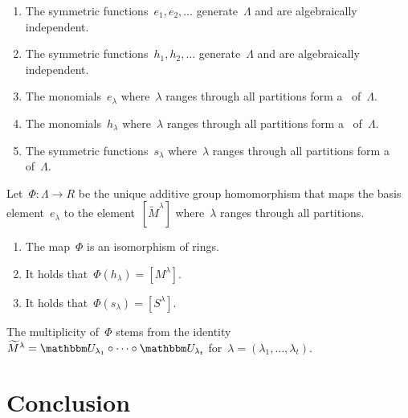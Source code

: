 \documentclass[a4paper,10pt]{scrartcl}
\begin{document}
\begin{proposition}
  \leavevmode
  \begin{enumerate}
    \item
      The symmetric functions~$e_1, e_2, \dotsc$ generate~$\Lambda$ and are algebraically independent.
    \item
      The symmetric functions~$h_1, h_2, \dotsc$ generate~$\Lambda$ and are algebraically independent.
    \item
      The monomials~$e_\lambda$ where~$\lambda$ ranges through all partitions form a~{\basis{$\Integer$}} of~$\Lambda$.
    \item
      The monomials~$h_\lambda$ where~$\lambda$ ranges through all partitions form a~{\basis{$\Integer$}} of~$\Lambda$.
    \item
      The symmetric functions~$s_\lambda$ where~$\lambda$ ranges through all partitions form a~{\basis{$\Integer$}} of~$\Lambda$.
  \end{enumerate}
\end{proposition}


\begin{theorem}
  Let~$\Phi \colon \Lambda \to R$ be the unique additive group homomorphism that maps the basis element~$e_\lambda$ to the element~$[\widetilde{M}^\lambda]$ where~$\lambda$ ranges through all partitions.
  \begin{enumerate}
    \item
      The map~$\Phi$ is an isomorphism of rings.
    \item
      It holds that~$\Phi(h_\lambda) = [M^\lambda]$.
    \item
      It holds that~$\Phi(s_\lambda) = [S^\lambda]$.
  \end{enumerate}
\end{theorem}

The multiplicity of~$\Phi$ stems from the identity~$\widetilde{M}^\lambda = \signrep_{\lambda_1} \circ \dotsb \circ \signrep_{\lambda_t}$ for~$\lambda = (\lambda_1, \dotsc, \lambda_t)$.





\section{Conclusion}
\end{document}

